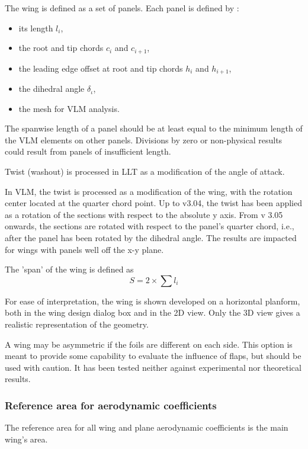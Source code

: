 \documentclass[a4paper,twoside,12pt,dvips]{article}
\begin{document}
The wing is defined as a set of panels. Each panel is defined by :

\begin{itemize}
\item its length $l_i$,
\item the root and tip chords $c_i$ and $c_{i+1}$,
\item the leading edge offset at root and tip chords $h_i$ and
$h_{i+1}$,
\item the dihedral angle $\delta_\iota$,
\item the mesh for VLM analysis.
\end{itemize}

The spanwise length of a panel should be at least equal to the minimum
length of the VLM elements on other panels. Divisions by zero or
non-physical results could result from panels of insufficient length.

Twist (washout) is processed in LLT as a modification of the angle of
attack.

In VLM, the twist is processed as a modification of the wing, with the
rotation center located at the quarter chord point.\newline
Up to v3.04, the twist has been applied as a rotation of the sections
with respect to the absolute y axis. From v 3.05 onwards, the sections
are rotated with respect to the panel's quarter chord, i.e., after the
panel has been rotated by the dihedral angle. The results are impacted
for wings with panels well off the x-y plane.

The 'span' of the wing is defined as \[S = 2 \times \sum l_i\]

For ease of interpretation, the wing is shown developed on a horizontal
planform, both in the wing design dialog box and in the 2D view. Only
the 3D view gives a realistic representation of the geometry.

A wing may be asymmetric if the foils are different on each side. This
option is meant to provide some capability to evaluate the influence of
flaps, but should be used with caution. It has been tested neither
against experimental nor theoretical results.

\subsubsection{Reference area for aerodynamic coefficients}

The reference area for all wing and plane aerodynamic coefficients is
the main wing's area.
\end{document}
